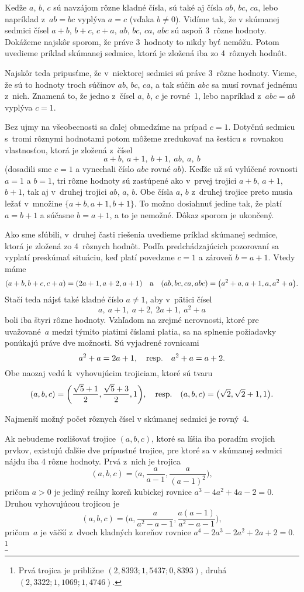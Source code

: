{%
Keďže $a$, $b$, $c$ sú navzájom rôzne kladné čísla,
sú také aj čísla $ab$, $bc$, $ca$, lebo napríklad
z~$ab=bc$ vyplýva $a=c$ (vďaka $b\ne0$). Vidíme tak, že
v skúmanej sedmici čísel $a+b$, $b+c$, $c+a$, $ab$, $bc$, $ca$, $abc$
sú aspoň 3~rôzne hodnoty. Dokážeme najskôr sporom,
že práve 3~hodnoty to nikdy byť nemôžu. Potom uvedieme príklad
skúmanej sedmice, ktorá je zložená iba zo 4~rôznych hodnôt.

Najskôr teda pripusťme, že v~niektorej sedmici sú práve 3~rôzne hodnoty.
Vieme, že sú to hodnoty troch súčinov $ab$, $bc$, $ca$,
a tak súčin $abc$ sa musí rovnať jednému z~nich. Znamená to,
že jedno z~čísel $a$, $b$, $c$ je rovné~1, lebo napríklad
z~$abc=ab$ vyplýva $c=1$.

Bez ujmy na všeobecnosti sa ďalej obmedzíme na prípad $c=1$. Dotyčnú
sedmicu s~tromi rôznymi hodnotami potom môžeme zredukovať na šesticu
s~rovnakou vlastnosťou, ktorá je zložená z~čísel
$$
a+b,\ a+1,\ b+1,\ ab, \ a,\ b
$$
(dosadili sme $c=1$ a vynechali číslo $abc$ rovné $ab$).
Keďže už sú vylúčené rovnosti $a=1$ a $b=1$, tri rôzne
hodnoty sú zastúpené ako v~prvej trojici $a+b$, $a+1$, $b+1$,
tak aj v~druhej trojici $ab$, $a$, $b$.
Obe čísla $a$, $b$ z~druhej trojice preto musia ležať
v~množine $\{a+b,a+1,b+1\}$. To možno dosiahnuť jedine tak,
že platí $a=b+1$ a súčasne $b=a+1$, a to je nemožné.
Dôkaz sporom je ukončený.

Ako sme sľúbili, v~druhej časti riešenia uvedieme príklad skúmanej
sedmice, ktorá je zložená zo 4~rôznych hodnôt. Podľa predchádzajúcich
pozorovaní sa vyplatí preskúmať situáciu, keď platí povedzme $c=1$ a
zároveň $b=a+1$. Vtedy máme
$$
(a+b,b+c,c+a)=(2a+1,a+2,a+1)\quad\hbox{a}\quad
(ab,bc,ca,abc)=\bigl(a^2+a,a+1,a,a^2+a\bigr).
$$
Stačí teda nájsť také kladné číslo $a\ne1$, aby v~pätici čísel
$$
a,\ a+1,\ a+2,\ 2a+1,\ a^2+a
$$
boli iba štyri rôzne hodnoty. Vzhľadom na zrejmé nerovnosti,
ktoré pre uvažované~$a$ medzi týmito piatimi číslami platia, sa
na splnenie požiadavky ponúkajú práve dve možnosti. Sú
vyjadrené rovnicami
$$
a^2+a=2a+1,\quad\hbox{resp.}\quad a^2+a=a+2.
$$
Obe naozaj vedú k~vyhovujúcim trojiciam, ktoré sú tvaru
$$
(a,b,c)=\biggl(\frac{\sqrt5+1}2,\frac{\sqrt5+3}2,1\biggr),
\quad\hbox{resp.}\quad
(a,b,c)=\bigl(\sqrt2,\sqrt2+1,1\bigr).
$$

\zaver
Najmenší možný počet rôznych čísel v skúmanej sedmici je rovný~4.

\poznamka
Ak nebudeme rozlišovať trojice $(a,b,c)$, ktoré sa líšia iba
poradím svojich prvkov, existujú ďalšie dve prípustné trojice,
pre ktoré sa v skúmanej sedmici nájdu iba 4 rôzne hodnoty. Prvá z~nich
je trojica
$$
(a,b,c)=\biggl(a,\frac{a}{a-1},\frac{a}{(a-1)^2}\biggr),
$$
pričom $a>0$ je jediný reálny koreň kubickej rovnice
$a^3-4a^2+4a-2=0$. Druhou vyhovujúcou trojicou je
$$
(a,b,c)=\biggl(a, \frac{a}{a^2-a-1}, \frac{a(a-1)}{a^2-a-1}\biggr),
$$
pričom~$a$ je väčší z~dvoch kladných koreňov rovnice $a^4-2a^3-2a^2+2a+2=0$.%
\footnote{Prvá trojica je približne
$(2{,}8393;1{,}5437;0{,}8393)$, druhá
$(2{,}3322;1{,}1069;1{,}4746)$.}


}
